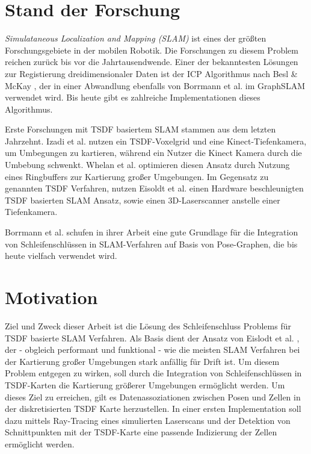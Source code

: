 \section{Stand der Forschung} \label{label:sdf}

\textit{Simulataneous Localization and Mapping (SLAM)} ist eines der größten Forschungsgebiete in der mobilen Robotik.
Die Forschungen zu diesem Problem reichen zurück bis vor die Jahrtausendwende.
Einer der bekanntesten Lösungen zur Registierung dreidimensionaler Daten ist der ICP Algorithmus nach Besl \& McKay \cite{besl1992method}, der in einer Abwandlung ebenfalls von Borrmann et al. im GraphSLAM \cite{borrmann2008globally} verwendet wird.
Bis heute gibt es zahlreiche Implementationen dieses Algorithmus.

Erste Forschungen mit TSDF basiertem SLAM stammen aus dem letzten Jahrzehnt.
Izadi et al. \cite{izadi2011kinectfusion} nutzen ein TSDF-Voxelgrid und eine Kinect-Tiefenkamera, um Umbegungen zu kartieren, während ein Nutzer die Kinect Kamera durch die Umbebung schwenkt.
Whelan et al. \cite{whelan2012kintinuous} optimieren diesen Ansatz durch Nutzung eines Ringbuffers zur Kartierung großer Umgebungen.
Im Gegensatz zu genannten TSDF Verfahren, nutzen Eisoldt et al. \cite{HATSDF} einen Hardware beschleunigten TSDF basierten SLAM Ansatz, sowie einen 3D-Laserscanner anstelle einer Tiefenkamera.

Borrmann et al. \citep{borrmann2008globally} schufen in ihrer Arbeit eine gute Grundlage für die Integration von Schleifenschlüssen in SLAM-Verfahren auf Basis von Pose-Graphen, die bis heute vielfach verwendet wird.



\section{Motivation}

Ziel und Zweck dieser Arbeit ist die Lösung des Schleifenschluss Problems für TSDF basierte SLAM Verfahren.
Als Basis dient der Ansatz von Eislodt et al. \cite{HATSDF}, der - obgleich performant und funktional - wie die meisten SLAM Verfahren bei der Kartierung großer Umgebungen stark anfällig für Drift ist. Um diesem Problem entgegen zu wirken, soll durch die Integration von Schleifenschlüssen in TSDF-Karten die Kartierung größerer Umgebungen ermöglicht werden.
Um dieses Ziel zu erreichen, gilt es Datenassoziationen zwischen Posen und Zellen in der diskretisierten TSDF Karte herzustellen.
In einer ersten Implementation soll dazu mittels Ray-Tracing eines simulierten Laserscans und der Detektion von Schnittpunkten mit der TSDF-Karte eine passende Indizierung der Zellen ermöglicht werden.

